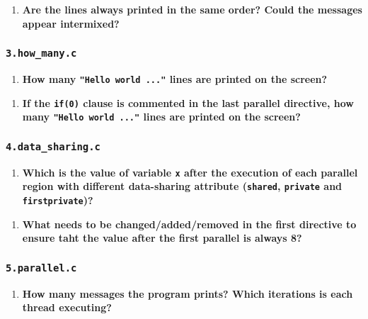 \documentclass[a4paper]{article}
\begin{document}
\begin{enumerate}[resume]
	\item \textbf{Are the lines always printed in the same order? Could the messages appear intermixed?}
\end{enumerate}

\subsubsection{\texttt{3.how\_many.c}}

\begin{enumerate}
	\item \textbf{How many \texttt{"Hello world ..."} lines are printed on the screen?}
\end{enumerate}

\begin{enumerate}[resume]
	\item \textbf{If the \texttt{if(0)} clause is commented in the last parallel directive, how many \texttt{"Hello world ..."} lines are printed on the screen?}
\end{enumerate}

\subsubsection{\texttt{4.data\_sharing.c}}

\begin{enumerate}
	\item \textbf{Which is the value of variable \texttt{x} after the execution of each parallel region with different data-sharing attribute (\texttt{shared}, \texttt{private} and \texttt{firstprivate})?}
\end{enumerate}

\begin{enumerate}[resume]
	\item \textbf{What needs to be changed/added/removed in the first directive to ensure taht the value after the first parallel is always 8?}
\end{enumerate}

\subsubsection{\texttt{5.parallel.c}}

\begin{enumerate}
	\item \textbf{How many messages the program prints? Which iterations is each thread executing?}
\end{enumerate}
\end{document}
